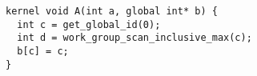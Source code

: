 \newsavebox{\IntelPrepareKernelArgs}
\begin{lrbox}{\IntelPrepareKernelArgs}
  \begin{minipage}{\textwidth}
    \begin{verbatim}
kernel void A(int a, global int* b) {
  int c = get_global_id(0);
  int d = work_group_scan_inclusive_max(c);
  b[c] = c;
}
    \end{verbatim}
  \end{minipage}
\end{lrbox}
